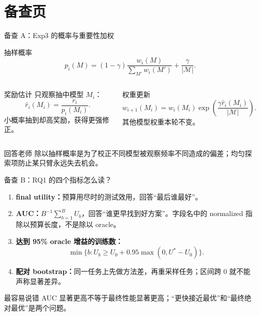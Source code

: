 \section*{备查页}

\begin{frame}{备查 A：Exp3 的概率与重要性加权}
\begin{block}{抽样概率}
\[
p_i(M)=(1-\gamma)\frac{w_i(M)}{\sum_{M'}w_i(M')}+\frac{\gamma}{|\mathcal M|}.
\]
\end{block}
\begin{columns}[T,onlytextwidth]
\begin{block}{奖励估计}
只观察抽中模型 $M_i$：
\[
\widehat r_i(M_i)=\frac{r_i}{p_i(M_i)}.
\]
小概率抽到却高奖励，获得更强修正。
\end{block}
\begin{block}{权重更新}
\[
w_{i+1}(M_i)=w_i(M_i)\exp\!\left(\frac{\gamma\widehat r_i(M_i)}{|\mathcal M|}\right).
\]
其他模型权重本轮不变。
\end{block}
\end{columns}
\begin{alertblock}{回答老师}
除以抽样概率是为了校正不同模型被观察频率不同造成的偏差；均匀探索项防止某只臂永远失去机会。
\end{alertblock}
\end{frame}

\begin{frame}{备查 B：RQ1 的四个指标怎么读？}
\small
\begin{enumerate}
  \item \textbf{final utility：}预算用尽时的测试效用，回答“最后谁最好”。
  \item \textbf{AUC：}$B^{-1}\sum_{b=1}^{B}U_b$，回答“谁更早找到好方案”。字段名中的 normalized 指除以预算长度，不是除以 oracle。
  \item \textbf{达到 95\% oracle 增益的训练数：}
  \[
  \min\{b:U_b\ge U_0+0.95\max(0,U^*-U_0)\}.
  \]
  \item \textbf{配对 bootstrap：}同一任务上先做方法差，再重采样任务；区间跨 0 就不能声称显著差异。
\end{enumerate}
\begin{alertblock}{最容易说错}
AUC 显著更高不等于最终性能显著更高；“更快接近最优”和“最终绝对最优”是两个问题。
\end{alertblock}
\end{frame}

